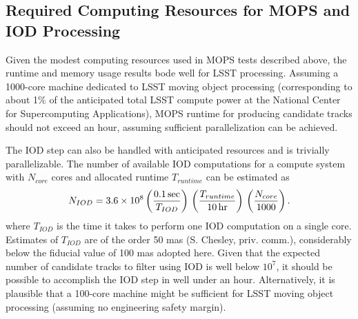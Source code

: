 \subsection{Required Computing Resources for MOPS and IOD Processing}

Given the modest computing resources used in MOPS tests described above, the runtime and memory
usage results bode well for LSST processing. Assuming a 1000-core machine dedicated to LSST moving
object processing (corresponding to about 1\% of the anticipated total LSST compute power at the
National Center for Supercomputing Applications), MOPS runtime for producing
candidate tracks should not exceed an hour, assuming sufficient parallelization can be achieved.

The IOD step can also be handled with anticipated resources and is trivially parallelizable. The number 
of available IOD computations for a compute system with $N_{core}$ cores and allocated runtime $T_{runtime}$ 
can be estimated as
\begin{equation}
  N_{IOD} = 3.6\times10^8 \left({ 0.1\,{\rm sec} \over T_{IOD}}\right) \,
                                         \left({ T_{runtime}  \over 10\,{\rm hr} }\right) \,
                                         \left({ N_{core}  \over 1000}\right).
\end{equation}
where $T_{IOD}$ is the time it takes to perform one IOD computation on a single core. Estimates
of $T_{IOD}$ are of the order 50 mas (S. Chesley, priv. comm.), considerably below the fiducial
value of 100 mas adopted here. Given that the expected number of candidate tracks to filter using
IOD is well below $10^7$, it should be possible to accomplish the IOD step in well under an hour.
Alternatively, it is plausible that a 100-core machine might be sufficient for LSST moving object
processing (assuming no engineering safety margin).
